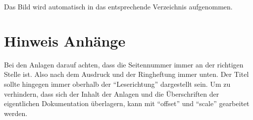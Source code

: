 Das Bild wird automatisch in das entsprechende Verzeichnis aufgenommen.

\section{Hinweis Anhänge}
Bei den Anlagen darauf achten, dass die Seitennummer immer an der richtigen Stelle ist. Also nach dem Ausdruck und der Ringheftung immer unten. Der Titel sollte hingegen immer oberhalb der \enquote{Leserichtung} dargestellt sein. Um zu verhindern, dass sich der Inhalt der Anlagen und die Überschriften der eigentlichen Dokumentation überlagern, kann mit \enquote{offset} und \enquote{scale} gearbeitet werden.